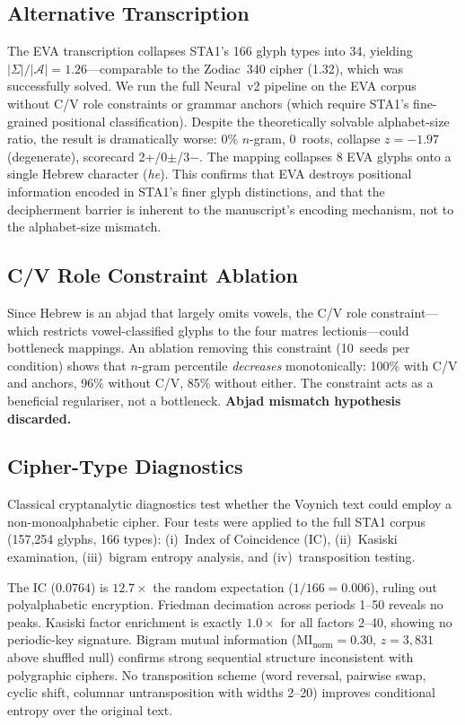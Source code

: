 \subsection{Alternative Transcription}

The EVA transcription collapses STA1's 166 glyph types into 34, yielding $|\Sigma|/|\mathcal{A}| = 1.26$---comparable to the Zodiac~340 cipher (1.32), which was successfully solved.  We run the full Neural~v2 pipeline on the EVA corpus without C/V role constraints or grammar anchors (which require STA1's fine-grained positional classification).  Despite the theoretically solvable alphabet-size ratio, the result is dramatically worse: 0\% $n$-gram, 0~roots, collapse $z = -1.97$ (degenerate), scorecard 2+/0$\pm$/3$-$.  The mapping collapses 8 EVA glyphs onto a single Hebrew character (\emph{he}).  This confirms that EVA destroys positional information encoded in STA1's finer glyph distinctions, and that the decipherment barrier is inherent to the manuscript's encoding mechanism, not to the alphabet-size mismatch.

\subsection{C/V Role Constraint Ablation}

Since Hebrew is an abjad that largely omits vowels, the C/V role constraint---which restricts vowel-classified glyphs to the four matres lectionis---could bottleneck mappings.  An ablation removing this constraint (10~seeds per condition) shows that $n$-gram percentile \emph{decreases} monotonically: 100\% with C/V and anchors, 96\% without C/V, 85\% without either.  The constraint acts as a beneficial regulariser, not a bottleneck.  \textbf{Abjad mismatch hypothesis discarded.}

\subsection{Cipher-Type Diagnostics}
\label{sec:cipher-diag}

Classical cryptanalytic diagnostics test whether the Voynich text could employ a non-monoalphabetic cipher.  Four tests were applied to the full STA1 corpus (157{,}254 glyphs, 166 types): (i)~Index of Coincidence (IC), (ii)~Kasiski examination, (iii)~bigram entropy analysis, and (iv)~transposition testing.

The IC ($0.0764$) is $12.7\times$ the random expectation ($1/166 = 0.006$), ruling out polyalphabetic encryption.  Friedman decimation across periods 1--50 reveals no peaks.  Kasiski factor enrichment is exactly $1.0\times$ for all factors 2--40, showing no periodic-key signature.  Bigram mutual information ($\mathrm{MI}_{\text{norm}} = 0.30$, $z = 3{,}831$ above shuffled null) confirms strong sequential structure inconsistent with polygraphic ciphers.  No transposition scheme (word reversal, pairwise swap, cyclic shift, columnar untransposition with widths 2--20) improves conditional entropy over the original text.

